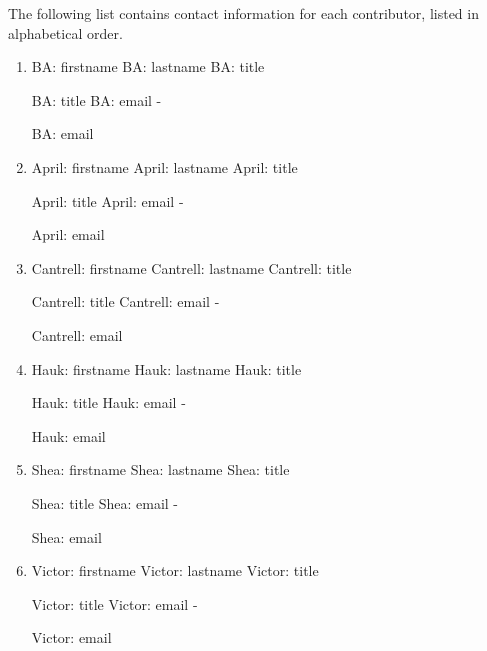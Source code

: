 \documentclass[11pt]{article}
\newcommand{\printcontributor}[1]{
  \begingroup
  \parindent 0pt
  \usevalue #1: firstname
  \space
  \usevalue #1: lastname
  \ifattribute #1: title {\par}{\relax}
  \usevalue #1: title
  \ifattribute #1: email {\space-\space} {\par\relax}
  \usevalue #1: email
  \endgroup
}
\begin{document}
\noindent The following list contains contact information for each contributor, listed in alphabetical order.

\begingroup
\parindent 0pt
\parskip  0pt

\begin{enumerate}

\item
\printcontributor{BA}

\item
\printcontributor{April}

\item 
\printcontributor{Cantrell}

\item
\printcontributor{Hauk}

\item
\printcontributor{Shea}

\item 
\printcontributor{Victor}

\end{enumerate}

\endgroup
\end{document}
